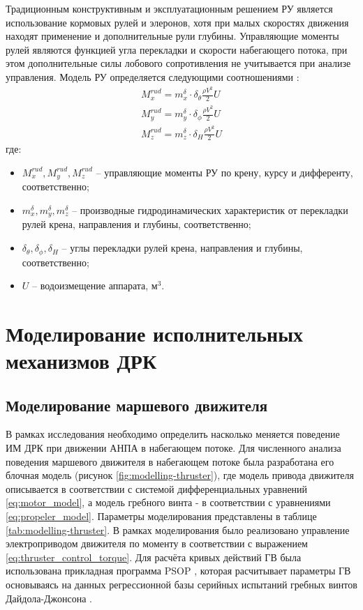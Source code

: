 Традиционным конструктивным и эксплуатационным решением РУ является использование кормовых рулей и элеронов, хотя при малых скоростях движения находят применение и дополнительные рули глубины.
Управляющие моменты рулей являются функцией угла перекладки и скорости набегающего потока, при этом дополнительные силы лобового сопротивления не учитывается при анализе управления.
Модель РУ определяется следующими соотношениями \cite{боженов1986}:
\begin{equation}
	\label{eq:modelling-rudder}
	\begin{array}{ll}
    M_x^{rud} = m_x^{\delta} \cdot \delta_{\theta} \frac{\rho V^2}{2} U \\
    M_y^{rud} = m_y^{\delta} \cdot \delta_{\phi} \frac{\rho V^2}{2} U \\
    M_z^{rud} = m_z^{\delta} \cdot \delta_{H} \frac{\rho V^2}{2} U
    \end{array}
\end{equation}
\noindent где:
\begin{itemize}
    \item $M_x^{rud}, M_y^{rud}, M_z^{rud}$ -- управляющие моменты РУ по крену, курсу и дифференту, соответственно;
    \item $m_x^{\delta}, m_y^{\delta}, m_z^{\delta}$ -- производные гидродинамических характеристик от перекладки рулей крена, направления и глубины, соответственно;
    \item $\delta_{\theta}, \delta_{\phi}, \delta_{H}$ -- углы перекладки рулей крена, направления и глубины, соответственно;
    \item $U$ -- водоизмещение аппарата, м$^3$.
\end{itemize}

\section{Моделирование исполнительных механизмов ДРК}
\subsection{Моделирование маршевого движителя}
В рамках исследования необходимо определить насколько меняется поведение ИМ ДРК при движении АНПА в набегающем потоке.
Для численного анализа поведения маршевого движителя в набегающем потоке была разработана его блочная модель (рисунок \ref{fig:modelling-thruster}), где модель привода движителя описывается в соответствии с системой дифференциальных уравнений \ref{eq:motor_model}, а модель гребного винта - в соответствии с уравнениями \ref{eq:propeler_model}.
Параметры моделирования представлены в таблице \ref{tab:modelling-thruster}.
В рамках моделирования было реализовано управление электроприводом движителя по моменту в соответствии с выражением \ref{eq:thruster_control_torque}.
Для расчёта кривых действий ГВ была использована прикладная программа PSOP \cite{инзарцев2018подводные}, которая расчитывает параметры ГВ основываясь на данных регрессионной
базы серийных испытаний гребных винтов Дайдола-Джонсона \cite{daidola1992propeller}.

